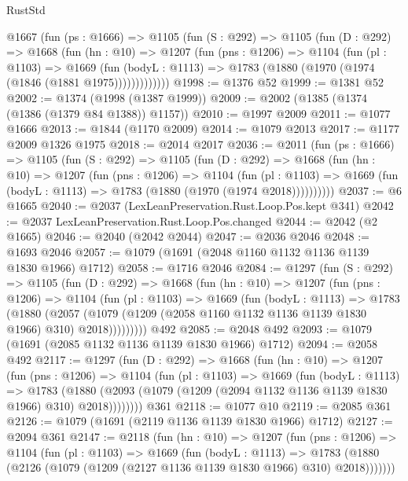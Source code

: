 \begin{lexlean}{RustStd}
\begin{coremodule}
    @1667
      (fun (ps : @1666) =>
      @1105
        (fun (S : @292) =>
        @1105
          (fun (D : @292) =>
          @1668
            (fun (hn : @10) =>
            @1207
              (fun (pns : @1206) =>
              @1104
                (fun (pl : @1103) =>
                @1669
                  (fun (bodyL : @1113) =>
                  @1783 (@1880 (@1970 (@1974 (@1846 (@1881 @1975)))))))))))))
@1998 := @1376 @52
@1999 := @1381 @52
@2002 := @1374 (@1998 (@1387 @1999))
@2009 := @2002 (@1385 (@1374 (@1386 (@1379 @84 @1388)) @1157))
@2010 := @1997 @2009
@2011 := @1077 @1666
@2013 := @1844 (@1170 @2009)
@2014 := @1079 @2013
@2017 := @1177 @2009 @1326 @1975
@2018 := @2014 @2017
@2036 := @2011
    (fun (ps : @1666) =>
    @1105
      (fun (S : @292) =>
      @1105
        (fun (D : @292) =>
        @1668
          (fun (hn : @10) =>
          @1207
            (fun (pns : @1206) =>
            @1104
              (fun (pl : @1103) =>
              @1669 (fun (bodyL : @1113) => @1783 (@1880 (@1970 (@1974 @2018))))))))))
@2037 := @6 @1665
@2040 := @2037 (LexLeanPreservation.Rust.Loop.Pos.kept @341)
@2042 := @2037 LexLeanPreservation.Rust.Loop.Pos.changed
@2044 := @2042 (@2 @1665)
@2046 := @2040 (@2042 @2044)
@2047 := @2036 @2046
@2048 := @1693 @2046
@2057 := @1079 (@1691 (@2048 @1160 @1132 @1136 @1139 @1830 @1966) @1712)
@2058 := @1716 @2046
@2084 := @1297
    (fun (S : @292) =>
    @1105
      (fun (D : @292) =>
      @1668
        (fun (hn : @10) =>
        @1207
          (fun (pns : @1206) =>
          @1104
            (fun (pl : @1103) =>
            @1669
              (fun (bodyL : @1113) =>
              @1783
                (@1880
                  (@2057
                    (@1079 (@1209 (@2058 @1160 @1132 @1136 @1139 @1830 @1966) @310) @2018)))))))))
    @492
@2085 := @2048 @492
@2093 := @1079 (@1691 (@2085 @1132 @1136 @1139 @1830 @1966) @1712)
@2094 := @2058 @492
@2117 := @1297
    (fun (D : @292) =>
    @1668
      (fun (hn : @10) =>
      @1207
        (fun (pns : @1206) =>
        @1104
          (fun (pl : @1103) =>
          @1669
            (fun (bodyL : @1113) =>
            @1783
              (@1880 (@2093 (@1079 (@1209 (@2094 @1132 @1136 @1139 @1830 @1966) @310) @2018))))))))
    @361
@2118 := @1077 @10
@2119 := @2085 @361
@2126 := @1079 (@1691 (@2119 @1136 @1139 @1830 @1966) @1712)
@2127 := @2094 @361
@2147 := @2118
    (fun (hn : @10) =>
    @1207
      (fun (pns : @1206) =>
      @1104
        (fun (pl : @1103) =>
        @1669
          (fun (bodyL : @1113) =>
          @1783 (@1880 (@2126 (@1079 (@1209 (@2127 @1136 @1139 @1830 @1966) @310) @2018)))))))

\end{coremodule}
\end{lexlean}
